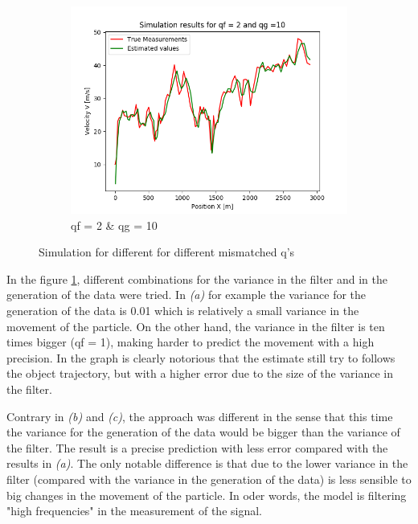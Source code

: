 \documentclass{article}
\begin{document}
\begin{figure}[H]
\begin{subfigure} {.3\textwidth}
                \includegraphics[width=0.9\linewidth]{./img/qf2_qg10.png}
                \caption{qf = 2 \& qg = 10}
            \end{subfigure}
            \caption{Simulation for different for different mismatched q's}
            \label{fig:mismatched}
        \end{figure}

        In the figure \ref{fig:mismatched}, different combinations for the variance in the filter and in 
        the generation of the data were tried. In \textit{(a)} for example the variance for the generation of
        the data is 0.01 which is relatively a small variance in the movement of the particle. On the other hand,
        the variance in the filter is ten times bigger (qf = 1), making harder to predict the movement with a high
        precision. In the graph is clearly notorious that the estimate still try to follows the object trajectory,
        but with a higher error due to the size of the variance in the filter.

        Contrary in \textit{(b)} and \textit{(c)}, the approach was different in the sense that this time the variance
        for the generation of the data would be bigger than the variance of the filter.  The result is a precise prediction 
        with less error compared with the results in \textit{(a)}. The only notable difference is that due to the lower variance 
        in the filter (compared with the variance in the generation of the data) is less sensible to big changes in the 
        movement of the particle. In oder words, the model is filtering "high frequencies" in the measurement of the signal.   
\end{document}
